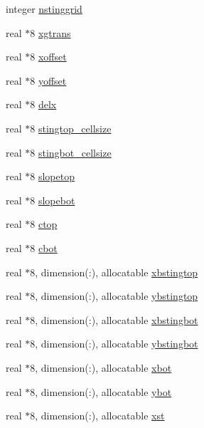 \begin{DoxyCompactItemize}
integer \hyperlink{namespacegridvar_ae3d6123e7025443a7d76ea994104734f}{nstinggrid}
\item 
real $\ast$8 \hyperlink{namespacegridvar_a0a1d150b576fa8e1243bb1aa8ab04fa0}{xgtrans}
\item 
real $\ast$8 \hyperlink{namespacegridvar_a31d3c65a0c90f341f558413f1f4386a6}{xoffset}
\item 
real $\ast$8 \hyperlink{namespacegridvar_af659082800429edb283c62f245146f28}{yoffset}
\item 
real $\ast$8 \hyperlink{namespacegridvar_a4e437e8bc140d7b17868d060514b7d59}{delx}
\item 
real $\ast$8 \hyperlink{namespacegridvar_a6da2f560ec3e950efa0855d27d01fe86}{stingtop\+\_\+cellsize}
\item 
real $\ast$8 \hyperlink{namespacegridvar_aa8b31ebbf73c3df1aa56e327142bcab5}{stingbot\+\_\+cellsize}
\item 
real $\ast$8 \hyperlink{namespacegridvar_a0325ce2437768ded8f8819e05a341433}{slopetop}
\item 
real $\ast$8 \hyperlink{namespacegridvar_a241785fa73202eb4a891ece68ffa4fd1}{slopebot}
\item 
real $\ast$8 \hyperlink{namespacegridvar_a6ab302a8157787da35aa4bef702ce7db}{ctop}
\item 
real $\ast$8 \hyperlink{namespacegridvar_a4dbed8798130fc3925a584d911eb397b}{cbot}
\item 
real $\ast$8, dimension(\+:), allocatable \hyperlink{namespacegridvar_a679d95eb858c82d2409d67d8c7defa5b}{xbstingtop}
\item 
real $\ast$8, dimension(\+:), allocatable \hyperlink{namespacegridvar_a0639e46ae56097b6f054ec6ec8fa5929}{ybstingtop}
\item 
real $\ast$8, dimension(\+:), allocatable \hyperlink{namespacegridvar_a7b37df25204691373d89716e5f39a528}{xbstingbot}
\item 
real $\ast$8, dimension(\+:), allocatable \hyperlink{namespacegridvar_a3f89618ccfbc9f5f8b2fef3e844fde54}{ybstingbot}
\item 
real $\ast$8, dimension(\+:), allocatable \hyperlink{namespacegridvar_abda87534e29c12083ccea2d949c300e9}{xbot}
\item 
real $\ast$8, dimension(\+:), allocatable \hyperlink{namespacegridvar_ad952a63f5ae1d8ed5480c9670ac9ecff}{ybot}
\item 
real $\ast$8, dimension(\+:), allocatable \hyperlink{namespacegridvar_a2f9709ea33206d334446b47b7e2ca726}{xst}
\item 

\end{DoxyCompactItemize}

